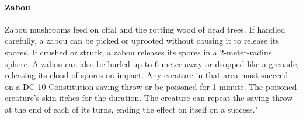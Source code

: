    \paragraph{Zabou}
        Zabou mushrooms feed on offal and the rotting wood of dead trees.
        If handled carefully, a zabou can be picked or uprooted without causing it to release its spores.
        If crushed or struck, a zabou releases its spores in a 2-meter-radius sphere.
        A zabou can also be hurled up to 6 meter away or dropped like a grenade, releasing its cloud of spores on impact.
        Any creature in that area must succeed on a DC 10 Constitution saving throw or be poisoned for 1 minute.
        The poisoned creature's skin itches for the duration.
        The creature can repeat the saving throw at the end of each of its turns, ending the effect on itself on a success."

\newpage~\newpage
